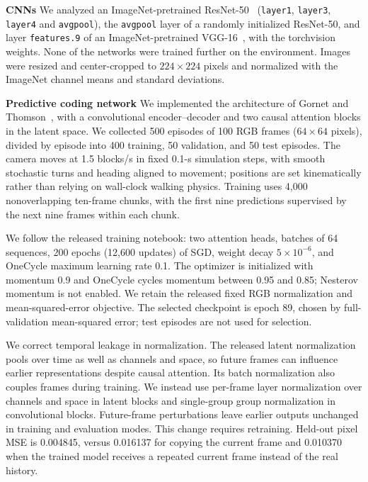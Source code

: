 \documentclass[11pt]{article}
\begin{document}
{\bf CNNs}
We analyzed an ImageNet-pretrained ResNet-50~\cite{He2016} (\texttt{layer1}, \texttt{layer3}, \texttt{layer4} and \texttt{avgpool}), the \texttt{avgpool} layer of a randomly initialized ResNet-50, and layer \texttt{features.9} of an ImageNet-pretrained VGG-16~\cite{Simonyan2015}, with the torchvision weights. None of the networks were trained further on the environment. Images were resized and center-cropped to $224\times224$ pixels and normalized with the ImageNet channel means and standard deviations.

{\bf Predictive coding network}
We implemented the architecture of Gornet and Thomson~\cite{Gornet2024automated}, with a convolutional encoder--decoder and two causal attention blocks in the latent space. We collected 500 episodes of 100 RGB frames ($64\times64$ pixels), divided by episode into 400 training, 50 validation, and 50 test episodes. The camera moves at 1.5 blocks/s in fixed 0.1-s simulation steps, with smooth stochastic turns and heading aligned to movement; positions are set kinematically rather than relying on wall-clock walking physics. Training uses 4,000 nonoverlapping ten-frame chunks, with the first nine predictions supervised by the next nine frames within each chunk.

We follow the released training notebook: two attention heads, batches of 64 sequences, 200 epochs (12,600 updates) of SGD, weight decay $5\times10^{-6}$, and OneCycle maximum learning rate 0.1. The optimizer is initialized with momentum 0.9 and OneCycle cycles momentum between 0.95 and 0.85; Nesterov momentum is not enabled. We retain the released fixed RGB normalization and mean-squared-error objective. The selected checkpoint is epoch 89, chosen by full-validation mean-squared error; test episodes are not used for selection.

We correct temporal leakage in normalization. The released latent normalization pools over time as well as channels and space, so future frames can influence earlier representations despite causal attention. Its batch normalization also couples frames during training. We instead use per-frame layer normalization over channels and space in latent blocks and single-group group normalization in convolutional blocks. Future-frame perturbations leave earlier outputs unchanged in training and evaluation modes. This change requires retraining. Held-out pixel MSE is 0.004845, versus 0.016137 for copying the current frame and 0.010370 when the trained model receives a repeated current frame instead of the real history.
\end{document}
